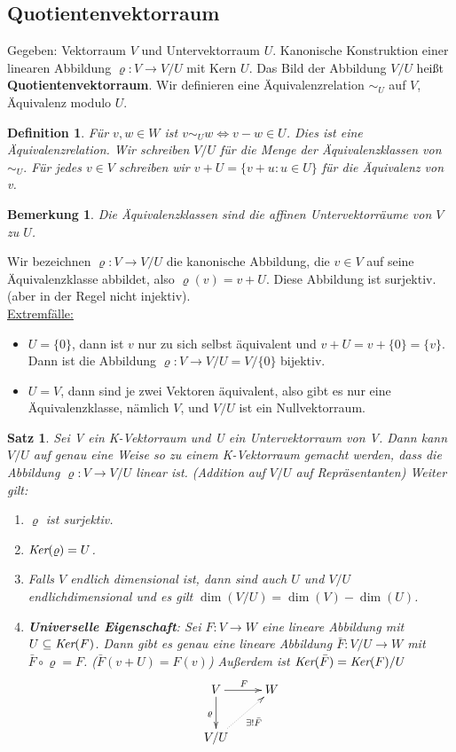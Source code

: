 \documentclass[12pt,a4paper]{article}
\theoremstyle{plain}
\newtheorem{Satz}[Theorem]{Satz}
\newtheorem{Definition}[Theorem]{Definition}
\newtheorem{Bemerkung}[Theorem]{Bemerkung}
\newcommand{\herv}[1]{{\emph{\textbf{#1}}}}
\numberwithin{equation}{section}
\begin{document}
\subsection{Quotientenvektorraum}
Gegeben: Vektorraum $V$ und Untervektorraum $U$. Kanonische Konstruktion einer linearen Abbildung $\varrho : V \rightarrow V/U$ mit Kern $U$. Das Bild der Abbildung $V/U$ heißt \textbf{Quotientenvektorraum}. Wir definieren eine Äquivalenzrelation $\sim_U$ auf $V$, \glqq Äquivalenz modulo $U$\grqq.
\begin{Definition}
Für $v,w\in W$ ist $v\sim_U w \Leftrightarrow v-w \in U$. Dies ist eine Äquivalenzrelation. Wir schreiben $V/U$ für die Menge der Äquivalenzklassen von $\sim_U.$ Für jedes $v\in V$ schreiben wir $v+U=\{v+u:u\in U\}$ für die Äquivalenz von v.
\end{Definition}
\begin{Bemerkung}
Die Äquivalenzklassen sind die affinen Untervektorräume von $V$ zu $U$.
\end{Bemerkung}
Wir bezeichnen $\varrho:V\rightarrow V/U$ die kanonische Abbildung, die $v\in V$ auf seine Äquivalenzklasse abbildet, also $\varrho(v)=v+U$. Diese Abbildung ist surjektiv. (aber in der Regel nicht injektiv). \\
\underline{Extremfälle:} \begin{itemize}
\item $U=\{0\}$, dann ist $v$ nur zu sich selbst äquivalent und $v+U=v+\{0\}=\{v\}$. Dann ist die Abbildung $\varrho : V\rightarrow V/U=V/\{0\}$ bijektiv.
\item $U=V$, dann sind je zwei Vektoren äquivalent, also gibt es nur eine Äquivalenzklasse, nämlich $V$, und $V/U$ ist ein Nullvektorraum.
\end{itemize}
\begin{Satz}
Sei V ein K-Vektorraum und U ein Untervektorraum von V. Dann kann $V/U$ auf genau eine Weise so zu einem K-Vektorraum gemacht werden, dass die Abbildung $\varrho:V\rightarrow V/U$ linear ist. (Addition auf $V/U$ auf Repräsentanten) Weiter gilt:
\begin{enumerate}
\renewcommand{\labelenumi}{\emph{\alph{enumi})}}
\item $\varrho$ ist surjektiv.
\item $\emph{Ker}(\varrho)=U$.
\item Falls $V$ endlich dimensional ist, dann sind auch $U$ und $V/U$ endlichdimensional und es gilt $\dim(V/U)=\dim(V)-\dim(U)$.
\item \herv{Universelle Eigenschaft}: Sei $F:V\rightarrow W$ eine lineare Abbildung mit $U\subseteq \emph{Ker}(F)$. Dann gibt es genau eine lineare Abbildung $\bar{F}:V/U\rightarrow W$ mit $\bar{F}\circ \varrho=F$. ($\bar{F}(v+U)=F(v)$) Außerdem ist $\emph{Ker}(\bar{F})=\emph{Ker}(F)/U$
\[ \begin{xy}
	\xymatrix{
		V \ar[r]^F \ar[d]_\varrho & W \\
		V/U \ar@{.>}[ru]_{\exists ! \bar{F}}
	}
\end{xy} \]
\end{enumerate}
\end{Satz}
\end{document}
